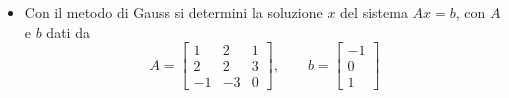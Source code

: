 \begin{itemize}
\item Con il metodo di Gauss si determini la soluzione $x$ del sistema $Ax=b$, con $A$ e $b$ dati
da
\bigskip
\[
A=\left[
\begin{array}{ccc}
1 & 2 & 1 \\
2 & 2 & 3\\
-1 & -3 & 0
\end{array}\right],\quad \quad
b=\left[
\begin{array}{c}
  -1\\
   0 \\
   1
\end{array}\right]
\]
\end{itemize}
